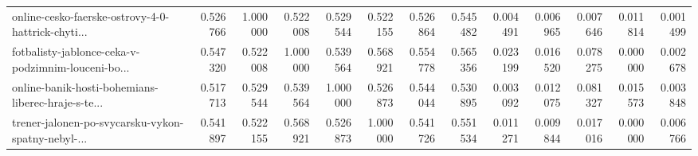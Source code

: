 \begin{tabular}{lrrrrrrrrrrrr}
online-cesko-faerske-ostrovy-4-0-hattrick-chyti... &                                           0.526766 &                                           1.000000 &                                           0.522008 &                                           0.529544 &                                           0.522155 &                                           0.526864 &                                           0.545482 &                                     0.004491 &                                           0.006965 &                                           0.007646 &                                           0.011814 &                                           0.001499 \\
fotbalisty-jablonce-ceka-v-podzimnim-louceni-bo... &                                           0.547320 &                                           0.522008 &                                           1.000000 &                                           0.539564 &                                           0.568921 &                                           0.554778 &                                           0.565356 &                                     0.023199 &                                           0.016520 &                                           0.078275 &                                           0.000000 &                                           0.002678 \\
online-banik-hosti-bohemians-liberec-hraje-s-te... &                                           0.517713 &                                           0.529544 &                                           0.539564 &                                           1.000000 &                                           0.526873 &                                           0.544044 &                                           0.530895 &                                     0.003092 &                                           0.012075 &                                           0.081327 &                                           0.015573 &                                           0.003848 \\
trener-jalonen-po-svycarsku-vykon-spatny-nebyl-... &                                           0.541897 &                                           0.522155 &                                           0.568921 &                                           0.526873 &                                           1.000000 &                                           0.541726 &                                           0.551534 &                                     0.011271 &                                           0.009844 &                                           0.017016 &                                           0.000000 &                                           0.006766 \\

\end{tabular}
